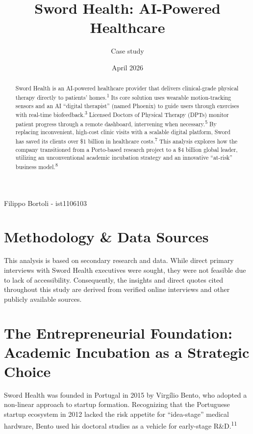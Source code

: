 \documentclass[12pt]{article}
\title{Sword Health: AI-Powered Healthcare}
\author{Case study}
\date{April 2026}
\begin{document}
\begin{titlepage}
    \maketitle
    
    \begin{center}
        \vspace{0.5cm}
        Filippo Bortoli - ist1106103
    \end{center}

    \vfill
    \begin{abstract}
    Sword Health is an AI-powered healthcare provider that delivers clinical-grade physical therapy directly to patients' homes.\textsuperscript{1} Its core solution uses wearable motion-tracking sensors and an AI ``digital therapist'' (named Phoenix) to guide users through exercises with real-time biofeedback.\textsuperscript{3} Licensed Doctors of Physical Therapy (DPTs) monitor patient progress through a remote dashboard, intervening when necessary.\textsuperscript{5}
    By replacing inconvenient, high-cost clinic visits with a scalable digital platform, Sword has saved its clients over \$1 billion in healthcare costs.\textsuperscript{7} This analysis explores how the company transitioned from a Porto-based research project to a \$4 billion global leader, utilizing an unconventional academic incubation strategy and an innovative ``at-risk'' business model.\textsuperscript{8}
    \end{abstract}
    \vfill
\end{titlepage}

\newpage

\tableofcontents
\newpage

\section*{Methodology \& Data Sources}
This analysis is based on secondary research and data. While direct primary interviews with Sword Health executives were sought, they were not feasible due to lack of accessibility. Consequently, the insights and direct quotes cited throughout this study are derived from verified online interviews and other publicly available sources.

\section{The Entrepreneurial Foundation: Academic Incubation as a Strategic Choice}
Sword Health was founded in Portugal in 2015 by Virgílio Bento, who adopted a non-linear approach to startup formation. Recognizing that the Portuguese startup ecosystem in 2012 lacked the risk appetite for ``idea-stage'' medical hardware, Bento used his doctoral studies as a vehicle for early-stage R\&D.\textsuperscript{11}
\end{document}
